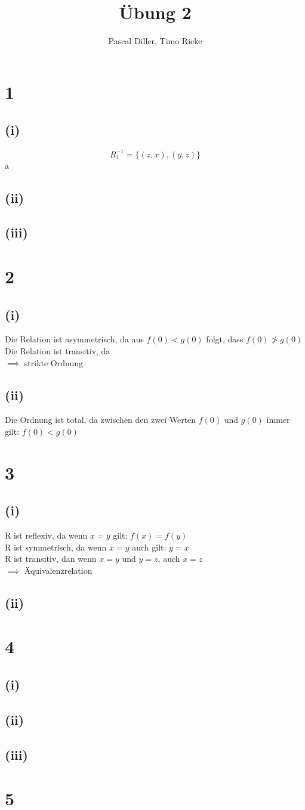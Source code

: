 \documentclass{article}
\title{Übung 2}
\author{Pascal Diller, Timo Rieke}
\begin{document}
\maketitle

\section{1}
\subsection{(i)}
\[R_1^{-1} = \{(z,x),(y,z)\}\]
a
\subsection{(ii)}
\subsection{(iii)}

\section{2}
\subsection{(i)}
Die Relation ist asymmetrisch, da aus $f(0) < g(0)$ folgt, dass $f(0) \ngtr g(0)$ \\
Die Relation ist transitiv, da \\
$\implies$ strikte Ordnung
\subsection{(ii)}
Die Ordnung ist total, da zwischen den zwei Werten $f(0)$ und $g(0)$ immer gilt: $f(0) < g(0)$

\section{3}
\subsection{(i)}
R ist reflexiv, da wenn $x = y$ gilt: $f(x) = f(y)$ \\
R ist symmetrisch, da wenn $x = y$ auch gilt: $y = x$ \\
R ist transitiv, dan wenn $x = y$ und $y = z$, auch $x = z$ \\
$\implies$ Äquivalenzrelation
\subsection{(ii)}

\section{4}
\subsection{(i)}
\subsection{(ii)}
\subsection{(iii)}

\section{5}
\end{document}
